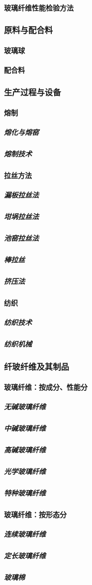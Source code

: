 \documentclass[UTF8]{../../ApplicationUniverse}
\begin{document}
            \paragraph{玻璃纤维性能检验方法}
        \subsubsection{原料与配合料}
            \paragraph{玻璃球}
            \paragraph{配合料}
        \subsubsection{生产过程与设备}
            \paragraph{熔制}
                \subparagraph{熔化与熔窑}
                \subparagraph{熔制技术}
            \paragraph{拉丝方法}
                \subparagraph{漏板拉丝法}
                \subparagraph{坩埚拉丝法}
                \subparagraph{池窑拉丝法}
                \subparagraph{棒拉丝}
                \subparagraph{挤压法}
            \paragraph{纺织}
                \subparagraph{纺织技术}
                \subparagraph{纺织机械}
        \subsubsection{纤玻纤维及其制品}
            \paragraph{玻璃纤维：按成分、性能分}
                \subparagraph{无碱玻璃纤维}
                \subparagraph{中碱玻璃纤维}
                \subparagraph{高碱玻璃纤维}
                \subparagraph{光学玻璃纤维}
                \subparagraph{特种玻璃纤维}
            \paragraph{玻璃纤维：按形态分}
                \subparagraph{连续玻璃纤维}
                \subparagraph{定长玻璃纤维}
                \subparagraph{玻璃棉}
\end{document}
